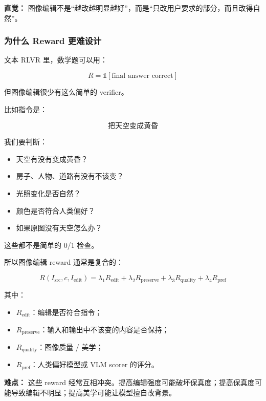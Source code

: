 \begin{intubox}
\textbf{直觉：} 图像编辑不是“越改越明显越好”，而是“只改用户要求的部分，而且改得自然”。
\end{intubox}

\subsubsection{为什么 Reward 更难设计}

文本 RLVR 里，数学题可以用：

\[
R = \mathbb{1}[\text{final answer correct}]
\]

但图像编辑很少有这么简单的 verifier。

比如指令是：

\[
\text{把天空变成黄昏}
\]

我们要判断：

\begin{itemize}[leftmargin=1.5em]
  \item 天空有没有变成黄昏？
  \item 房子、人物、道路有没有不该变？
  \item 光照变化是否自然？
  \item 颜色是否符合人类偏好？
  \item 如果原图没有天空怎么办？
\end{itemize}

这些都不是简单的 0/1 检查。

所以图像编辑 reward 通常是复合的：

\[
R(I_\text{src},c,I_\text{edit})
=
\lambda_1 R_\text{edit}
+
\lambda_2 R_\text{preserve}
+
\lambda_3 R_\text{quality}
+
\lambda_4 R_\text{pref}
\]

其中：

\begin{itemize}[leftmargin=1.5em]
  \item $R_\text{edit}$：编辑是否符合指令；
  \item $R_\text{preserve}$：输入和输出中不该变的内容是否保持；
  \item $R_\text{quality}$：图像质量 / 美学；
  \item $R_\text{pref}$：人类偏好模型或 VLM scorer 的评分。
\end{itemize}

\begin{warnbox}
\textbf{难点：} 这些 reward 经常互相冲突。提高编辑强度可能破坏保真度；提高保真度可能导致编辑不明显；提高美学可能让模型擅自改背景。
\end{warnbox}

